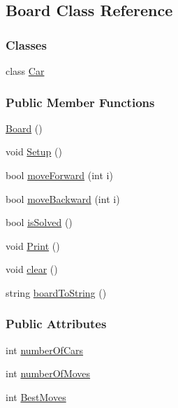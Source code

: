 \hypertarget{class_board}{}\subsection{Board Class Reference}
\label{class_board}
\subsubsection*{Classes}
\begin{DoxyCompactItemize}
\item 
class \hyperlink{class_board_1_1_car}{Car}
\end{DoxyCompactItemize}
\subsubsection*{Public Member Functions}
\begin{DoxyCompactItemize}
\item 
\hyperlink{class_board_a9ee491d4fea680cf69b033374a9fdfcb}{Board} ()
\item 
void \hyperlink{class_board_acaab7fa1b333b7fef8226d4f12f3d646}{Setup} ()
\item 
bool \hyperlink{class_board_ab1741c33e159fa6d45f0c2ddfdcaabb3}{move\+Forward} (int i)
\item 
bool \hyperlink{class_board_a105c57336f28ab608ed585909b2a4ab5}{move\+Backward} (int i)
\item 
bool \hyperlink{class_board_a5c587fd8aaf4a98020e0e65c5fdbe9b4}{is\+Solved} ()
\item 
void \hyperlink{class_board_a6eeb539f96ed3e7a0edb7277d81521d1}{Print} ()
\item 
void \hyperlink{class_board_af74f0d4b43e5aa3faea16d7c6407b05e}{clear} ()
\item 
string \hyperlink{class_board_a82e40ab4c8b67e51a68c918babe11977}{board\+To\+String} ()
\end{DoxyCompactItemize}
\subsubsection*{Public Attributes}
\begin{DoxyCompactItemize}
\item 
int \hyperlink{class_board_ae0cd5faf221be36798fd4fbd458bb10e}{number\+Of\+Cars}
\item 
int \hyperlink{class_board_a0f1716a3334ffba859db870d6b321a29}{number\+Of\+Moves}
\item 
int \hyperlink{class_board_a8e15496239739e402313d3faa1555109}{Best\+Moves}
\end{DoxyCompactItemize}
